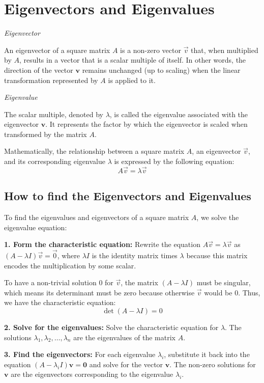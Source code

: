 \newpage
\section{Eigenvectors and Eigenvalues}

\emph{Eigenvector}

An eigenvector of a square matrix \(A\) is a non-zero vector \(\vec{v}\) that, when multiplied by \(A\), results in a vector that is a scalar multiple of itself. In other words, the direction of the vector \(\mathbf{v}\) remains unchanged (up to scaling) when the linear transformation represented by \(A\) is applied to it.

\emph{Eigenvalue}

The scalar multiple, denoted by \(\lambda\), is called the eigenvalue associated with the eigenvector \(\mathbf{v}\). It represents the factor by which the eigenvector is scaled when transformed by the matrix \(A\).

Mathematically, the relationship between a square matrix \(A\), an eigenvector \(\vec{v}\), and its corresponding eigenvalue \(\lambda\) is expressed by the following equation:
\[
A\vec{v} = \lambda\vec{v}
\]

\subsection{How to find the Eigenvectors and Eigenvalues}

To find the eigenvalues and eigenvectors of a square matrix \(A\), we solve the eigenvalue equation:

\textbf{1. Form the characteristic equation:}
    Rewrite the equation \(A\vec{v} = \lambda\vec{v}\) as 
    \((A - \lambda I)\vec{v} = \vec{0}\), where \(\lambda I\) is the identity matrix times \(\lambda\) because 
    this matrix encodes the multiplication by some scalar. 
    
    To have a non-trivial solution \(0\) for \(\vec{v}\), the matrix \((A - \lambda I)\) must be 
    singular, which means its determinant must be zero because otherwise \(\vec{v}\) would be 0. Thus, we have the characteristic equation:
    \[
    \det(A - \lambda I) = 0
    \]

\textbf{2. Solve for the eigenvalues:}
    Solve the characteristic equation for \(\lambda\). The solutions \(\lambda_1, \lambda_2, \dots, \lambda_n\) are the eigenvalues of the matrix \(A\).

\textbf{3. Find the eigenvectors:}
    For each eigenvalue \(\lambda_i\), substitute it back into the equation \((A - \lambda_i I)\mathbf{v} = \mathbf{0}\) and solve for the vector \(\mathbf{v}\). The non-zero solutions for \(\mathbf{v}\) are the eigenvectors corresponding to the eigenvalue \(\lambda_i\).

